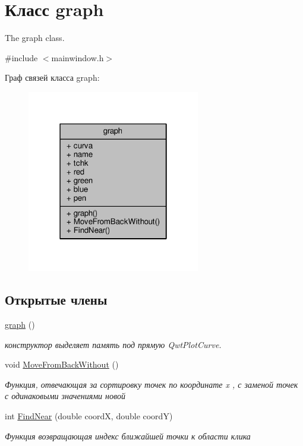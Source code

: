\hypertarget{classgraph}{}\section{Класс graph}
\label{classgraph}


The graph class.  




{\ttfamily \#include $<$mainwindow.\+h$>$}



Граф связей класса graph\+:\nopagebreak
\begin{figure}[H]
\begin{center}
\leavevmode
\includegraphics[width=214pt]{classgraph__coll__graph}
\end{center}
\end{figure}
\subsection*{Открытые члены}
\begin{DoxyCompactItemize}
\item 
\hyperlink{classgraph_a6aaa56b4528d2fdb8f0ecd97e04f6651}{graph} ()\hypertarget{classgraph_a6aaa56b4528d2fdb8f0ecd97e04f6651}{}\label{classgraph_a6aaa56b4528d2fdb8f0ecd97e04f6651}

\begin{DoxyCompactList}\small\item\em конструктор выделяет память под прямую Qwt\+Plot\+Curve. \end{DoxyCompactList}\item 
void \hyperlink{classgraph_af46434aacc2b15519b6a25943570ce05}{Move\+From\+Back\+Without} ()\hypertarget{classgraph_af46434aacc2b15519b6a25943570ce05}{}\label{classgraph_af46434aacc2b15519b6a25943570ce05}

\begin{DoxyCompactList}\small\item\em Функция, отвечающая за сортировку точек по координате x , с заменой точек с одинаковыми значениями новой \end{DoxyCompactList}\item 
int \hyperlink{classgraph_a69b8295dbfe6bcfab5050e3fdcc257f2}{Find\+Near} (double coordX, double coordY)
\begin{DoxyCompactList}\small\item\em Функция возвращающая индекс ближайшей точки к области клика \end{DoxyCompactList}\end{DoxyCompactItemize}
